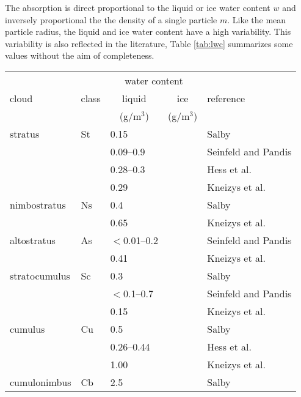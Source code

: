 %
The absorption is direct proportional to the liquid or ice water
content $w$ and inversely proportional the the density of a single
particle $m$. Like the mean particle radius, the liquid and ice water
content have a high variability. This variability is also reflected in
the literature, Table \ref{tab:lwc} summarizes some values without the
aim of completeness.
\begin{table}[!htb]
\begin{center}
\begin{tabular}{lllll}
\hline
              &       & \multicolumn{2}{c}{water content} & \\
 cloud        & class & \multicolumn{1}{c}{liquid} & \multicolumn{1}{c}{ice} & reference \\
              &       & \multicolumn{1}{c}{(g/m$^3$)} & \multicolumn{1}{c}{(g/m$^3$)} & \\
\hline
 stratus      & St    & 0.15         &    & Salby \cite{salby:96}\\
              &       & 0.09--0.9    &    & Seinfeld and Pandis \cite{seinfeld:98}\\
              &       & 0.28--0.3    &    & Hess et al. \cite{hess:98}\\
              &       & 0.29         &    & Kneizys et al. \cite{abreu:96}\\
 nimbostratus & Ns    & 0.4          &    & Salby \cite{salby:96}\\
              &       & 0.65         &    & Kneizys et al. \cite{abreu:96}\\
 altostratus  & As    & $<$0.01--0.2 &    & Seinfeld and Pandis \cite{seinfeld:98}\\
              &       & 0.41         &    & Kneizys et al. \cite{abreu:96}\\
 stratocumulus& Sc    & 0.3          &    & Salby \cite{salby:96}\\
              &       & $<$0.1--0.7  &    & Seinfeld and Pandis \cite{seinfeld:98}\\
              &       & 0.15         &    & Kneizys et al. \cite{abreu:96}\\
 cumulus      & Cu    & 0.5          &    & Salby \cite{salby:96}\\
              &       & 0.26--0.44   &    & Hess et al. \cite{hess:98}\\
              &       & 1.00         &    & Kneizys et al. \cite{abreu:96}\\
 cumulonimbus & Cb    & 2.5          &    & Salby \cite{salby:96}\\

\end{tabular}
\end{center}
\end{table}
